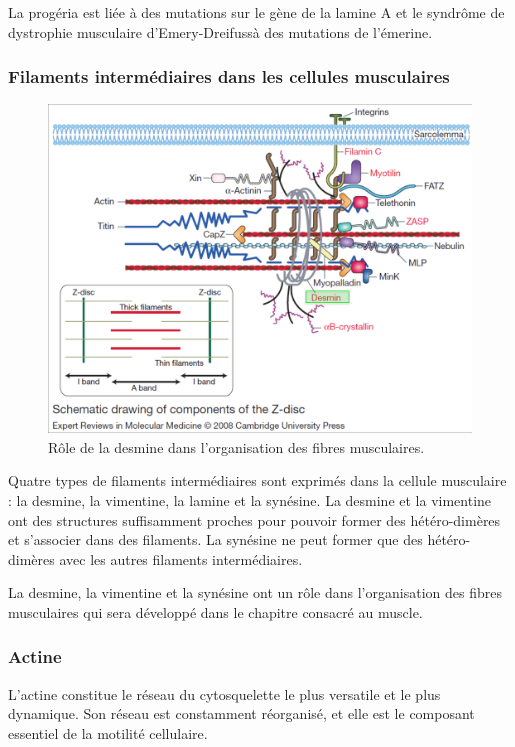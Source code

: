 La progéria est liée à des mutations sur le gène de la lamine A  et le syndrôme de dystrophie musculaire d'Emery-Dreifussà des mutations de l'émerine. 


\subsubsection{Filaments intermédiaires dans les cellules musculaires}
\begin{figure}
\includegraphics[scale=0.15]{sarcomere.png}
\caption{Rôle de la desmine dans l'organisation des fibres musculaires.}
\end{figure}
Quatre types de filaments intermédiaires sont exprimés dans la cellule musculaire : la desmine, la vimentine, la lamine et la synésine. 
La desmine et la vimentine ont des structures suffisamment proches pour pouvoir former des hétéro-dimères et s'associer dans des filaments. La synésine ne peut former que des hétéro-dimères avec les autres filaments intermédiaires. 

La desmine, la vimentine et la synésine ont un rôle dans l'organisation des fibres musculaires qui sera développé dans le chapitre consacré au muscle. 



\subsubsection{Actine}
  
L'actine constitue le réseau du cytosquelette le plus versatile et le plus dynamique. Son réseau est constamment réorganisé, et elle est le composant essentiel de la motilité cellulaire. 

